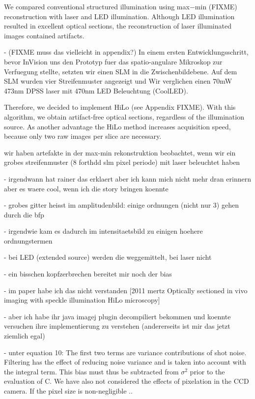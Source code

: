 We compared conventional structured illumination using max$-$min
(FIXME) reconstruction with laser and LED illumination. Although LED
illumination resulted in excellent optical sections, the
reconstruction of laser illuminated images contained artifacts.

{\color{red} - (FIXME muss das vielleicht in appendix?) In einem
ersten Entwicklungsschritt, bevor InVision uns den Prototyp fuer das
spatio-angulare Mikroskop zur Verfuegung stellte, setzten wir einen
SLM in die Zwischenbildebene. Auf dem SLM wurden vier Streifenmuster
angezeigt und Wir verglichen einen 70mW 473nm DPSS laser mit 470nm LED
Beleuchtung (CoolLED).}

Therefore, we decided to implement HiLo (see Appendix FIXME). With
this algorithm, we obtain artifact-free optical sections, regardless
of the illumination source. As another advantage the HiLo method
increases acquisition speed, because only two raw images per slice are
necessary.


{\color{red} wir haben artefakte in der max-min rekonstruktion
beobachtet, wenn wir ein grobes streifenmuster (8 forthdd slm pixel
periode) mit laser beleuchtet haben

     - irgendwann hat rainer das erklaert aber ich kann mich nicht
mehr dran erinnern aber es waere cool, wenn ich die story bringen
koennte
     
- grobes gitter heisst im amplitudenbild: einige ordnungen (nicht nur
3) gehen durch die bfp

     - irgendwie kam es dadurch im intensitaetsbild zu einigen hoehere
ordnungstermen

     - bei LED (extended source) werden die weggemittelt, bei laser
nicht

       - ein bisschen kopfzerbrechen bereitet mir noch der bias

       - im paper habe ich das nicht verstanden [2011 mertz Optically
sectioned in vivo imaging with speckle illumination HiLo microscopy]

       - aber ich habe ihr java imagej plugin decompiliert bekommen
und koennte versuchen ihre implementierung zu verstehen (andererseits
ist mir das jetzt ziemlich egal)

       - unter equation 10: The first two terms are variance
contributions of shot noise. Filtering has the effect of reducing
noise variance and is taken into account with the integral term. This
bias must thus be subtracted from $\sigma^2$ prior to the evaluation
of C. We have also not considered the effects of pixelation in the CCD
camera. If the pixel size is non-negligible ..  }

